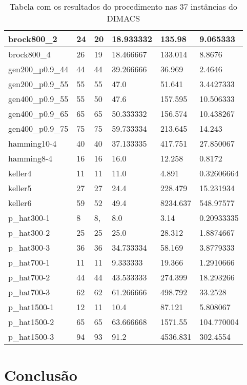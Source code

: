 \documentclass{article}
\begin{document}
\begin{center}
\begin{table}
\begin{tabular}{| l | l | l | l | l | l |}
brock800\_2			&	24			&20			&18.933332		&135.98		&9.065333\\ \hline
brock800\_4			&	26			&19			&18.466667		&133.014	&8.8676\\ \hline
gen200\_p0.9\_44	&	44			&44			&39.266666		&36.969		&2.4646	\\ \hline
gen200\_p0.9\_55	&	55			&55			&47.0			&51.641		&3.4427333\\ \hline
gen400\_p0.9\_55	&	55			&50			&47.6			&157.595	&10.506333\\ \hline
gen400\_p0.9\_65	&	65			&65			&50.333332		&156.574	&10.438267\\ \hline
gen400\_p0.9\_75	&	75			&75			&59.733334		&213.645	&14.243\\ \hline
hamming10-4		&	40			&40			&37.133335		&417.751	&27.850067\\ \hline
hamming8-4			&	16			&16			&16.0			&12.258		&0.8172\\ \hline
keller4				&	11			&11			&11.0			&4.891		&0.32606664\\ \hline
keller5				&	27			&27			&24.4			&228.479	&15.231934\\ \hline
keller6				&	59			&52			&49.4			&8234.637	&548.97577\\ \hline
p\_hat300-1			&	8			&8, 			&8.0			&3.14		&0.20933335\\ \hline
p\_hat300-2			&	25			&25			&25.0			&28.312		&1.8874667\\ \hline
p\_hat300-3			&	36			&36			&34.733334		&58.169		&3.8779333\\ \hline
p\_hat700-1			&	11			&11			&9.333333		&19.366		&1.2910666\\ \hline
p\_hat700-2			&	44			&44			&43.533333		&274.399	&18.293266\\ \hline
p\_hat700-3			&	62			&62			&61.266666		&498.792	&33.2528\\ \hline
p\_hat1500-1		&	12			&11			&10.4			&87.121		&5.808067\\ \hline
p\_hat1500-2		&	65			&65			&63.666668		&1571.55	&104.770004\\ \hline
p\_hat1500-3		&	94			&93			&91.2			&4536.831	&302.4554\\ \hline
    \hline
\end{tabular}
\caption{Tabela com os resultados do procedimento nas 37 instâncias do DIMACS}
\end{table}
\end{center}
\section{Conclusão}
\end{document}
